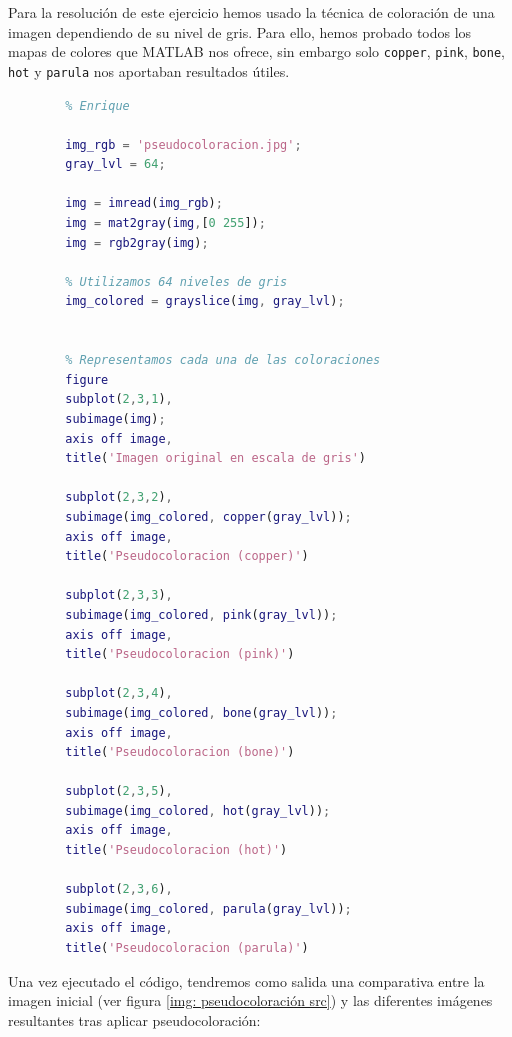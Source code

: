 \documentclass[12pt]{article}
\begin{document}
	\noindent Para la resolución de este ejercicio hemos usado la técnica de coloración de una imagen dependiendo de su nivel de gris. Para ello, hemos probado todos los mapas de colores que MATLAB nos ofrece, sin embargo solo \texttt{copper}, \texttt{pink}, \texttt{bone}, \texttt{hot} y \texttt{parula} nos aportaban resultados útiles.
	
	\begin{lstlisting}[language=Matlab, caption={Implementación de pseucoloración en MATLAB}]
		% 8 - Pseudocoloracion por nivel de gris
		% Enrique 
		
		img_rgb = 'pseudocoloracion.jpg';
		gray_lvl = 64;
		
		img = imread(img_rgb);
		img = mat2gray(img,[0 255]);
		img = rgb2gray(img);
		
		% Utilizamos 64 niveles de gris
		img_colored = grayslice(img, gray_lvl);
		
		
		% Representamos cada una de las coloraciones
		figure
		subplot(2,3,1),
		subimage(img);
		axis off image,
		title('Imagen original en escala de gris')
		
		subplot(2,3,2),
		subimage(img_colored, copper(gray_lvl));
		axis off image,
		title('Pseudocoloracion (copper)')
		
		subplot(2,3,3),
		subimage(img_colored, pink(gray_lvl));
		axis off image,
		title('Pseudocoloracion (pink)')
		
		subplot(2,3,4),
		subimage(img_colored, bone(gray_lvl));
		axis off image,
		title('Pseudocoloracion (bone)')
		
		subplot(2,3,5),
		subimage(img_colored, hot(gray_lvl));
		axis off image,
		title('Pseudocoloracion (hot)')
		
		subplot(2,3,6),
		subimage(img_colored, parula(gray_lvl));
		axis off image,
		title('Pseudocoloracion (parula)')
	\end{lstlisting}
	
	\pagebreak
	
	\noindent Una vez ejecutado el código, tendremos como salida una comparativa entre la imagen inicial (ver figura \ref{img: pseudocoloración src}) y las diferentes imágenes resultantes tras aplicar pseudocoloración:
	
\end{document}
